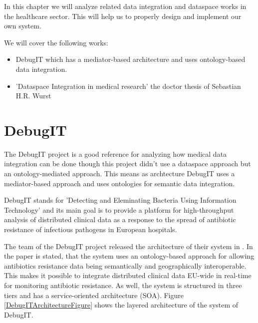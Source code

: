 
In this chapter we will analyze related data integration and dataspace works in the healthcare sector. This will help us to properly design and implement our own system.

We will cover the following works:

\begin{itemize}
\item DebugIT which has a mediator-based architecture and uses ontology-based data integration.
\item 'Dataspace Integration in medical research' the doctor thesis of Sebastian H.R. Wurst
\end{itemize}

\section{DebugIT}
The DebugIT project is a good reference for analyzing how medical data integration can be done though this project didn't use a dataspace approach but an ontology-mediated \cite{WurstDiss, DBLP:books/dp/LeserN2006} approach. This means as archtecture DebugIT uses a mediator-based approach and uses ontologies for semantic data integration.

DebugIT stands for 'Detecting and Eleminating Bacteria Using Information Technology' and its main goal is to provide a platform for high-throughput analysis of distributed clinical data as a response to the spread of antibiotic resistance of infectious pathogens in European hospitals\cite{UniFreiburgDebugITInfo}. 

The team of the DebugIT project released the architecture of their system in \cite{DBLP:conf/swat4ls/SchoberCDEDJTPLB14}.
In the paper is stated, that the system uses an ontology-based approach for allowing antibiotics resistance data being semantically and geographically interoperable. This makes it possible to integrate distributed clinical data EU-wide in real-time for monitoring antibiotic resistance. As well, the system is structured in three tiers and has a service-oriented architecture (SOA). Figure \ref{DebugITArchitectureFigure} shows the layered architecture of the system of DebugIT.

